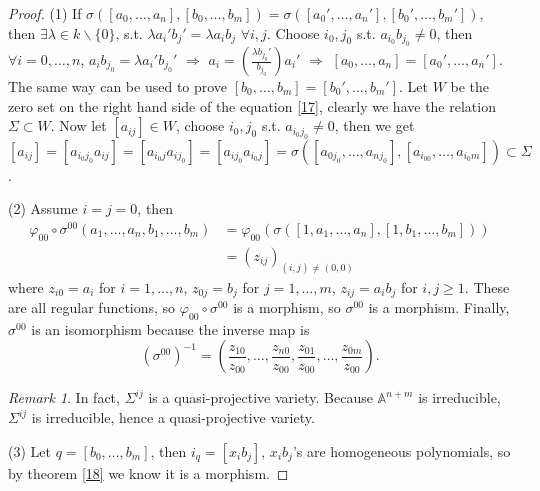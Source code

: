 \documentclass{amsart}
\theoremstyle{plain}
\theoremstyle{definition}
\theoremstyle{remark}
\newtheorem*{remark}{Remark}
\numberwithin{equation}{section}
\begin{document}
\begin{proof}
	(1) If $ \sigma( [a_0,\dots,a_n],[b_0,\dots,b_m] )=\sigma( [ a_0',\dots,a_n' ],[ b_0',\dots,b_m' ] ) $, then $ \exists \lambda\in k\backslash \{ 0 \} $, s.t. $ \lambda a_i'b_j'=\lambda a_ib_j $ $ \forall i,j $. Choose $ i_0,j_0 $ s.t. $ a_{i_0}b_{j_0}\neq 0 $, then $ \forall i=0,\dots,n $, $ a_ib_{j_0}=\lambda a_i'b_{j_0}' $ $ \Rightarrow $ $ a_i=\left(\frac{\lambda b_{j_0}'}{b_{j_0}}\right)a_i' $ $ \Rightarrow $ $ [a_0,\dots,a_n]=[{a_0}',\dots,{a_n}'] $. The same way can be used to prove $ [b_0,\dots,b_m]=[{b_0}',\dots,{b_m}'] $. Let $ W $ be the zero set on the right hand side of the equation \ref{17}, clearly we have the relation $ \Sigma\subset W $. Now let $ [a_{ij}]\in W $, choose $ i_0,j_0 $ s.t. $ a_{i_0j_0}\neq 0 $, then we get $ [a_{ij}]=[a_{i_0j_0}a_{ij}]=[a_{i_0j}a_{ij_0}]=[a_{ij_0}a_{i_0j}]=\sigma([a_{0j_0},\dots,a_{nj_0}],[a_{i_00},\dots,a_{i_0m}])\subset \Sigma $.

	(2) Assume $ i=j=0 $, then
	$$\begin{array}{cc}
		\varphi_{00}\circ\sigma^{00}(a_1,\dots,a_n,b_1,\dots,b_m) & =\varphi_{00}(\sigma([1,a_1,\dots,a_n],[1,b_1,\dots,b_m]))\\
		& =(z_{ij})_{(i,j)\neq(0,0)}
	\end{array}$$
	where $ z_{i0}=a_i $ for $ i=1,\dots,n $, $ z_{0j}=b_j $ for $ j=1,\dots,m $, $ z_{ij}=a_ib_j $ for $ i,j\geq 1 $. These are all regular functions, so  $ \varphi_{00}\circ \sigma^{00} $ is a morphism, so $ \sigma^{00} $ is a morphism. Finally, $ \sigma^{00} $ is an isomorphism because the inverse map is
	$$
	(\sigma^{00})^{-1}=\left(\frac{z_{10}}{z_{00}},\dots,\frac{z_{n0}}{z_{00}},\frac{z_{01}}{z_{00}},\dots,\frac{z_{0m}}{z_{00}}\right).
	$$
	\begin{remark}
		In fact,  $ \Sigma^{ij} $ is a quasi-projective  variety. Because $ \mathbb{A}^{n+m} $ is irreducible, $ \Sigma^{ij} $ is irreducible, hence a quasi-projective variety.
	\end{remark}

	(3) Let $ q=[b_0,\dots,b_m] $, then $ i_{q}=[x_ib_j] $, $ x_ib_j $'s are homogeneous polynomials, so by theorem \ref{18} we know it is a morphism.


\end{proof}
\end{document}
